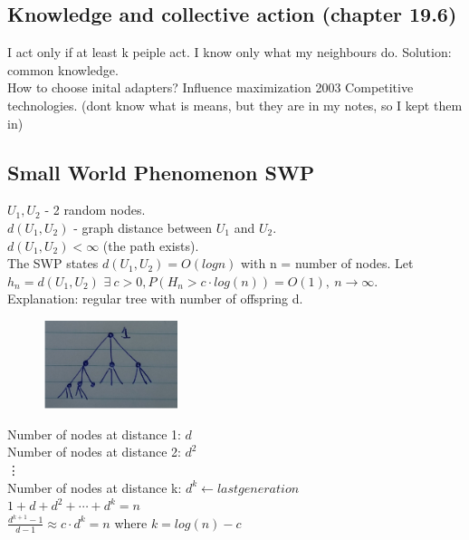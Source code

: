 \documentclass[12pt]{scrartcl}
\begin{document}
\subsection{Knowledge and collective action (chapter 19.6)}
I act only if at least k peiple act. I know only what my neighbours do. Solution: common knowledge.\\

How to choose inital adapters? Influence maximization 2003
Competitive technologies. (dont know what is means, but they are in my notes, so I kept them in)\\

\subsection{Small World Phenomenon SWP}
$U_{1}, U_{2}$ - 2 random nodes.\\
$d(U_{1}, U_{2})$ - graph distance between $U_{1}$ and $U_{2}$.\\
$d(U_{1}, U_{2}) < \infty$ (the path exists).\\

\noindent The SWP states $d(U_{1}, U_{2}) = O(log n)$ with n = number of nodes. Let $h_{n} = d(U_{1}, U_{2})$
$\exists\ c>0, P(H_{n} > c\cdot log(n)) = O(1),\ n\rightarrow \infty$.\\

\noindent Explanation: regular tree with number of offspring d.
\begin{figure}[h]
	\centering
	\includegraphics[width=0.35\textwidth]{./images/fig7.jpg} 
\end{figure}


\noindent Number of nodes at distance 1: $d$\\
Number of nodes at distance 2: $d^{2}$\\
\vdots						 \\
Number of nodes at distance k: $d^{k} \leftarrow last generation$\\

\noindent $1 + d + d^{2} + \cdots + d^{k} = n$\\
$\frac{d^{k+1}-1}{d-1} \approx c\cdot d^{k} = n$ where $k = log(n) - c$
\end{document}
